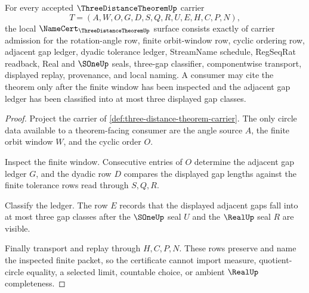 \begin{theorem}
\label{thm:three-distance-theorem-namecert-obligations}
For every accepted $\ThreeDistanceTheoremUp$ carrier
$$
T=(A,W,O,G,D,S,Q,R,U,E,H,C,P,N),
$$
the local $\NameCert_{\ThreeDistanceTheoremUp}$ surface consists exactly of carrier admission for the rotation-angle row, finite orbit-window row, cyclic ordering row, adjacent gap ledger, dyadic tolerance ledger, StreamName schedule, RegSeqRat readback, Real and $\SOneUp$ seals, three-gap classifier, componentwise transport, displayed replay, provenance, and local naming. A consumer may cite the theorem only after the finite window has been inspected and the adjacent gap ledger has been classified into at most three displayed gap classes.
\end{theorem}
\begin{proof}
Project the carrier of \autoref{def:three-distance-theorem-carrier}. The only circle data available to a theorem-facing consumer are the angle source $A$, the finite orbit window $W$, and the cyclic order $O$.

Inspect the finite window. Consecutive entries of $O$ determine the adjacent gap ledger $G$, and the dyadic row $D$ compares the displayed gap lengths against the finite tolerance rows read through $S,Q,R$.

Classify the ledger. The row $E$ records that the displayed adjacent gaps fall into at most three gap classes after the $\SOneUp$ seal $U$ and the $\RealUp$ seal $R$ are visible.

Finally transport and replay through $H,C,P,N$. These rows preserve and name the inspected finite packet, so the certificate cannot import measure, quotient-circle equality, a selected limit, countable choice, or ambient $\RealUp$ completeness.
\end{proof}

